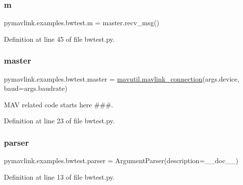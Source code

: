 \subsubsection{\texorpdfstring{m}{m}}
{\footnotesize\ttfamily pymavlink.\+examples.\+bwtest.\+m = master.\+recv\+\_\+msg()}



Definition at line 45 of file bwtest.\+py.

\mbox{\label{namespacepymavlink_1_1examples_1_1bwtest_a992c5d2dd65ab9fdb16be40008f497a6}} 
\subsubsection{\texorpdfstring{master}{master}}
{\footnotesize\ttfamily pymavlink.\+examples.\+bwtest.\+master = \mbox{\hyperlink{namespacepymavlink_1_1mavutil_aa6c4b8861f86ef3bb746fa0fab241c93}{mavutil.\+mavlink\+\_\+connection}}(args.\+device, baud=args.\+baudrate)}



M\+AV related code starts here \#\#\#. 



Definition at line 23 of file bwtest.\+py.

\mbox{\label{namespacepymavlink_1_1examples_1_1bwtest_afe076f1a3d008cd525c26a2a33b3d97f}} 
\subsubsection{\texorpdfstring{parser}{parser}}
{\footnotesize\ttfamily pymavlink.\+examples.\+bwtest.\+parser = Argument\+Parser(description=\+\_\+\+\_\+doc\+\_\+\+\_\+)}



Definition at line 13 of file bwtest.\+py.

\mbox{\label{namespacepymavlink_1_1examples_1_1bwtest_a75801b54e117a46a4f239b09fc2c27b6}} 
